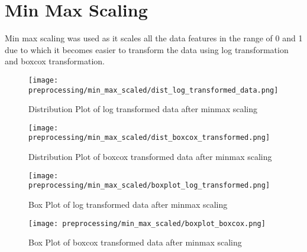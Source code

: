 \section{Min Max Scaling}
Min max scaling was used as it scales all the data features in the range of 0 and 1 due to which it becomes easier to transform the data using log transformation and boxcox transformation.

\begin{figure}[H]
    \centering
    \texttt{[image: preprocessing/min\_max\_scaled/dist\_log\_transformed\_data.png]}
    \caption{Distribution Plot of log transformed data after minmax scaling}
    \label{fig:Distribution Plot of log transformed data after minmax scaling}
\end{figure}

\begin{figure}[H]
    \centering
    \texttt{[image: preprocessing/min\_max\_scaled/dist\_boxcox\_transformed.png]}
    \caption{Distribution Plot of boxcox transformed data after minmax scaling}
    \label{fig:Distribution Plot of boxcox transformed data after minmax scaling}
\end{figure}

\begin{figure}[H]
    \centering
    \texttt{[image: preprocessing/min\_max\_scaled/boxplot\_log\_transformed.png]}
    \caption{Box Plot of log transformed data after minmax scaling}
    \label{fig:Box Plot of log transformed data after minmax scaling}
\end{figure}

\begin{figure}[H]
    \centering
    \texttt{[image: preprocessing/min\_max\_scaled/boxplot\_boxcox.png]}
    \caption{Box Plot of boxcox transformed data after minmax scaling}
    \label{fig:Box Plot of boxcox transformed data after minmax scaling}
\end{figure}


